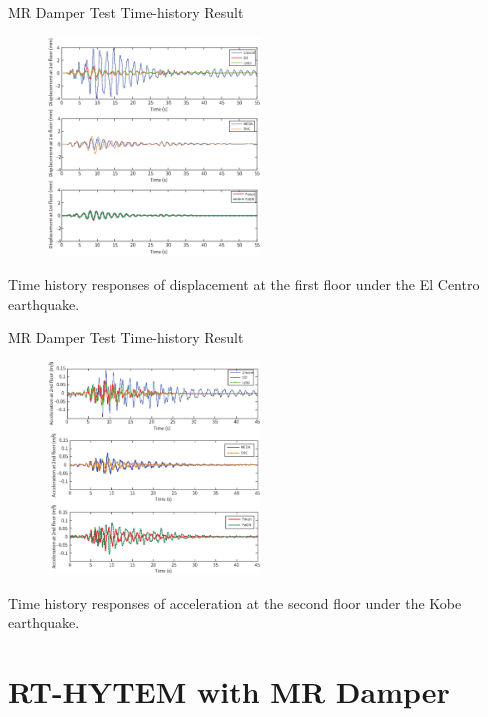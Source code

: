 \documentclass[usepdftitle=false]{beamer}
\begin{document}
\begin{frame}{MR Damper Test Time-history Result}
\begin{figure}[!ht]
\centering
\includegraphics[width=0.5\textwidth] {figure/n3-16.eps}
\label{fig:n3-16}
\end{figure}
Time history responses of displacement at the first floor under the El Centro earthquake.
\end{frame}

\begin{frame}{MR Damper Test Time-history Result}
\begin{figure}[!ht]
\centering
\includegraphics[width=0.5\textwidth] {figure/n3-17.eps}
\end{figure}
Time history responses of acceleration at the second floor under the Kobe earthquake.
\label{fig:n3-17}
\end{frame}






\section{RT-HYTEM with MR Damper}
\end{document}
